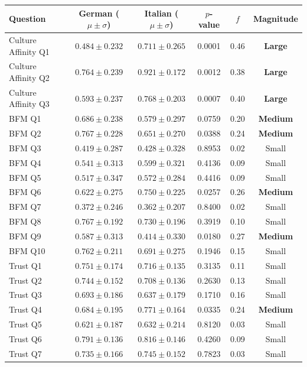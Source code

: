 \begin{table}[!ht]
\centering
\begin{tabular}{lccccc}
\toprule
Question & German ($\mu \pm \sigma$) & Italian ($\mu \pm \sigma$) & $p$-value & $f$ & Magnitude \\
\midrule
Culture Affinity Q1 & $0.484 \pm 0.232$ & $0.711 \pm 0.265$ & 0.0001 & 0.46 & \textbf{Large} \\
Culture Affinity Q2 & $0.764 \pm 0.239$ & $0.921 \pm 0.172$ & 0.0012 & 0.38 & \textbf{Large} \\
Culture Affinity Q3 & $0.593 \pm 0.237$ & $0.768 \pm 0.203$ & 0.0007 & 0.40 & \textbf{Large} \\
BFM Q1 & $0.686 \pm 0.238$ & $0.579 \pm 0.297$ & 0.0759 & 0.20 & \textbf{Medium} \\
BFM Q2 & $0.767 \pm 0.228$ & $0.651 \pm 0.270$ & 0.0388 & 0.24 & \textbf{Medium} \\
BFM Q3 & $0.419 \pm 0.287$ & $0.428 \pm 0.328$ & 0.8953 & 0.02 & Small \\
BFM Q4 & $0.541 \pm 0.313$ & $0.599 \pm 0.321$ & 0.4136 & 0.09 & Small \\
BFM Q5 & $0.517 \pm 0.347$ & $0.572 \pm 0.284$ & 0.4416 & 0.09 & Small \\
BFM Q6 & $0.622 \pm 0.275$ & $0.750 \pm 0.225$ & 0.0257 & 0.26 & \textbf{Medium} \\
BFM Q7 & $0.372 \pm 0.246$ & $0.362 \pm 0.207$ & 0.8400 & 0.02 & Small \\
BFM Q8 & $0.767 \pm 0.192$ & $0.730 \pm 0.196$ & 0.3919 & 0.10 & Small \\
BFM Q9 & $0.587 \pm 0.313$ & $0.414 \pm 0.330$ & 0.0180 & 0.27 & \textbf{Medium} \\
BFM Q10 & $0.762 \pm 0.211$ & $0.691 \pm 0.275$ & 0.1946 & 0.15 & Small \\
Trust Q1 & $0.751 \pm 0.174$ & $0.716 \pm 0.135$ & 0.3135 & 0.11 & Small \\
Trust Q2 & $0.744 \pm 0.152$ & $0.708 \pm 0.136$ & 0.2630 & 0.13 & Small \\
Trust Q3 & $0.693 \pm 0.186$ & $0.637 \pm 0.179$ & 0.1710 & 0.16 & Small \\
Trust Q4 & $0.684 \pm 0.195$ & $0.771 \pm 0.164$ & 0.0335 & 0.24 & \textbf{Medium} \\
Trust Q5 & $0.621 \pm 0.187$ & $0.632 \pm 0.214$ & 0.8120 & 0.03 & Small \\
Trust Q6 & $0.791 \pm 0.136$ & $0.816 \pm 0.146$ & 0.4260 & 0.09 & Small \\
Trust Q7 & $0.735 \pm 0.166$ & $0.745 \pm 0.152$ & 0.7823 & 0.03 & Small \\

\end{tabular}
\end{table}
